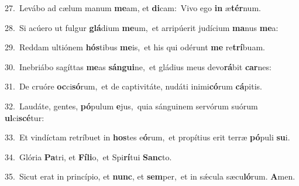 {\numbfont\textcolor{\numbcolor}{27.}}~Levábo ad cælum manum \textbf{me}\-am, et \textbf{di}\-cam:~\star Vivo ego \textbf{in} æ\-\textbf{tér}\-num.\par
{\numbfont\textcolor{\numbcolor}{28.}}~Si acúero ut fulgur \textbf{glá}\-dium \textbf{me}\-um,~\star et arripúerit judícium \textbf{ma}\-nus \textbf{me}\-a:\par
{\numbfont\textcolor{\numbcolor}{29.}}~Reddam ultiónem \textbf{hós}\-tibus \textbf{me}\-is,~\star et his qui odérunt \textbf{me} re\-\textbf{trí}\-buam.\par
{\numbfont\textcolor{\numbcolor}{30.}}~Inebriábo sagíttas \textbf{me}\-as \textbf{sán}\-\textbf{gui}ne,~\star et gládius meus devo\-\textbf{rá}\-bit \textbf{car}\-nes:\par
{\numbfont\textcolor{\numbcolor}{31.}}~De cruóre \textbf{oc}\-ci\-\textbf{só}\-rum,~\star et de captivitáte, nudáti inimi\-\textbf{có}\-rum \textbf{cá}\-pitis.\par
{\numbfont\textcolor{\numbcolor}{32.}}~Laudáte, gentes, \textbf{pó}\-pulum \textbf{e}\-jus,~\star quia sánguinem servórum suórum \textbf{ul}\-ci\-\textbf{scé}\-tur:\par
{\numbfont\textcolor{\numbcolor}{33.}}~Et vindíctam retríbuet in \textbf{hos}\-tes e\-\textbf{ó}\-rum,~\star et propítius erit terræ \textbf{pó}\-puli \textbf{su}\-i.\par
{\numbfont\textcolor{\numbcolor}{34.}}~Glória \textbf{Pa}\-tri, et \textbf{Fí}\-\textbf{li}o,~\star et Spi\-\textbf{rí}\-tui \textbf{Sanc}\-to.\par
{\numbfont\textcolor{\numbcolor}{35.}}~Sicut erat in princípio, et \textbf{nunc}\-, et \textbf{sem}\-per,~\star et in sǽcula sæcu\-\textbf{ló}\-rum. \textbf{A}\-men.\par
